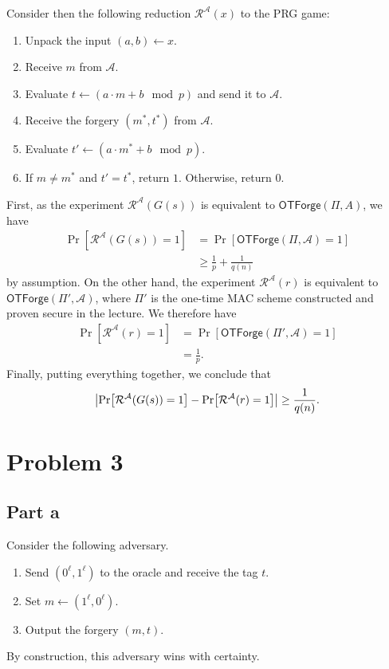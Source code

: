 \documentclass{article}
\theoremstyle{definition}
\begin{document}
Consider then the following reduction $\mathcal{R}^\mathcal{A}(x)$ to the PRG game:
\begin{enumerate}
    \item Unpack the input $(a, b)\gets x$.
    \item Receive $m$ from $\mathcal{A}$.
    \item Evaluate $t\gets(a\cdot m+b \mod p)$ and send it to $\mathcal{A}$.
    \item Receive the forgery $(m^*, t^*)$ from $\mathcal{A}$.
    \item Evaluate $t'\gets(a\cdot m^* + b \mod p)$.
    \item If $m\ne m^*$ and $t' = t^*$, return $1$. Otherwise, return $0$.
\end{enumerate}
First, as the experiment $\mathcal{R}^{\mathcal{A}}(G(s))$ is equivalent to $\mathsf{OTForge}(\Pi, A)$, we have
\begin{align*}
\Pr[\mathcal{R}^{\mathcal{A}}(G(s))=1]&= \Pr[\mathsf{OTForge}(\Pi, \mathcal{A})=1] \\
&\geq\frac{1}{p} + \frac{1}{q(n)}
\end{align*}
by assumption.
On the other hand, the experiment $\mathcal{R}^{\mathcal{A}}(r)$ is equivalent to $\mathsf{OTForge}(\Pi', \mathcal{A})$,
where $\Pi'$ is the one-time MAC scheme constructed and proven secure in the lecture.
We therefore have
\begin{align*}
\Pr[\mathcal{R}^{\mathcal{A}}(r)=1]&= \Pr[\mathsf{OTForge}(\Pi', \mathcal{A})=1] \\
&=\frac{1}{p}.
\end{align*}
Finally, putting everything together, we conclude that
\[
\abs{\Pr[\mathcal{R}^{\mathcal{A}}(G(s))=1] - \Pr[\mathcal{R}^{\mathcal{A}}(r)=1]}\geq \frac{1}{q(n)}.\]

\section*{Problem 3}

\subsection*{Part a}

Consider the following adversary.
\begin{enumerate}
    \item Send $(0^\ell, 1^\ell)$ to the oracle and receive the tag $t$.
    \item Set $m\gets (1^\ell, 0^\ell)$.
    \item Output the forgery $(m, t)$.
\end{enumerate}
By construction, this adversary wins with certainty. 
\end{document}
